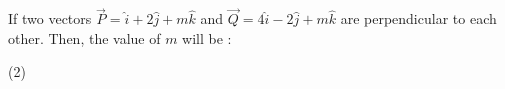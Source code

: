 \item If two vectors $\vec{P} = \hat{i} + 2\hat{j} + m\hat{k}$ and $\vec{Q} = 4\hat{i} - 2\hat{j} + m\hat{k}$ are perpendicular to each other. Then, the value of $m$ will be :
\begin{tasks}(2)
\end{tasks}